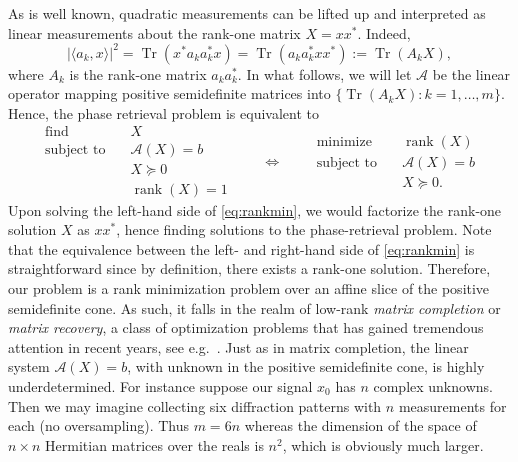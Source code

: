 \documentclass[11pt]{article}
\newcommand{\<}{\langle}
\renewcommand{\>}{\rangle}
\newcommand{\cA}{\mathcal{A}}
\newcommand{\rank}{\operatorname{rank}}
\newcommand{\trace}{\operatorname{Tr}}
\numberwithin{equation}{section}
\begin{document}
As is well known, quadratic measurements can be lifted up and
interpreted as linear measurements about the rank-one matrix $X = x
x^*$. Indeed,
\[
|\<a_k, x\>|^2 = \trace(x^* a_k a_k^* x) = \trace(a_k a_k^* x x^*) :=
\trace(A_k X),
\]
where $A_k$ is the rank-one matrix $a_k a_k^*$. %
In what follows, we
will let $\cA$ be the linear operator mapping positive semidefinite
matrices into $\{\trace(A_k X) : k = 1,\ldots, m\}$.  Hence, the phase
retrieval problem is equivalent to
\begin{equation}
\label{eq:rankmin}
  \begin{array}{ll}
    \text{find}   & \quad X\\ 
    \text{subject to} & \quad  \cA(X) = b\\
& \quad X \succeq 0\\
& \quad \rank(X) = 1
\end{array} 
\qquad \Leftrightarrow \qquad 
  \begin{array}{ll}
    \text{minimize}   & \quad \rank(X)\\ 
    \text{subject to} & \quad  \cA(X) = b\\
& \quad X \succeq 0. 
\end{array}
\end{equation}
Upon solving the left-hand side of \eqref{eq:rankmin}, we would
factorize the rank-one solution $X$ as $x x^*$, hence finding
solutions to the phase-retrieval problem. Note that the equivalence
between the left- and right-hand side of \eqref{eq:rankmin} is
straightforward since by definition, there exists a rank-one solution.
Therefore, our problem is a rank minimization problem over an affine
slice of the positive semidefinite cone. As such, it falls in the
realm of low-rank {\em matrix completion} or {\em matrix recovery}, a
class of optimization problems that has gained tremendous attention in
recent years, see e.g.~\cite{Recht07,CR08,CT09}. Just as in matrix
completion, the linear system $\cA(X) = b$, with unknown in the
positive semidefinite cone, is highly underdetermined. For instance
suppose our signal $x_0$ has $n$ complex unknowns. Then we may imagine
collecting six diffraction patterns with $n$ measurements for each (no
oversampling). Thus $m = 6n$ whereas the dimension of the space of $n
\times n$ Hermitian matrices over the reals is $n^2$, which is
obviously much larger.
\end{document}
